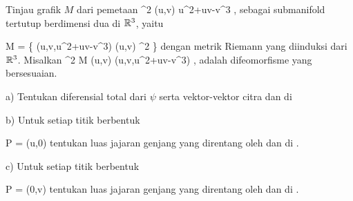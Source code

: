 {

Tinjau grafik $M$ dari pemetaan
\maabbeledisp {\varphi} {\R^2} {\R
} {(u,v)} { u^2+uv-v^3
} {,}
sebagai submanifold tertutup berdimensi dua di ${\mathbb R}^3$, yaitu

\mavergleichskettedisp
{\vergleichskette
{ M
}
{ =} { \left\{ (u,v,u^2+uv-v^3)  \mid  (u,v) \in \R^2         \right\}
}
{ } {
}
{ } {
}
{ } {
}
}
{}{}{}
dengan metrik Riemann yang diinduksi dari ${\mathbb R}^3$. Misalkan
\maabbeledisp {\psi} {\R^2} { M
} {(u,v)} { (u,v,u^2+uv-v^3)
} {,}
adalah difeomorfisme yang bersesuaian.

a) Tentukan diferensial total dari $\psi$ serta vektor-vektor citra
 dan
 di

b) Untuk setiap titik berbentuk

\mavergleichskette
{\vergleichskette
{ P
}
{ = }{ (u,0)
}
{  }{
}
{    }{
}
{   }{
}
}
{}{}{}
tentukan luas jajaran genjang yang direntang oleh
 dan
 di
.

c) Untuk setiap titik berbentuk

\mavergleichskette
{\vergleichskette
{ P
}
{ = }{ (0,v)
}
{  }{
}
{    }{
}
{   }{
}
}
{}{}{}
tentukan luas jajaran genjang yang direntang oleh
 dan
 di
.

}
